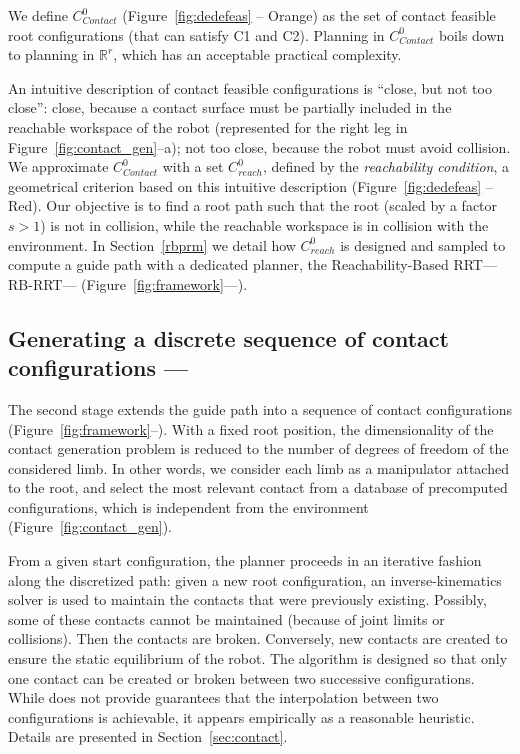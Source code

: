 We define $C_{Contact}^0$ (Figure~\ref{fig:dedefeas} -- Orange) as the set of \gls{contact feasible} root configurations (that can satisfy C1 and C2).
Planning in $C_{Contact}^0$ boils down to planning in $\mathbb{R}^r$, which has an acceptable practical complexity.

An intuitive description of \gls{contact feasible} configurations is ``close, but not too close'': close, because a contact surface must be partially included in the reachable workspace of the robot (represented for the right leg in Figure~\ref{fig:contact_gen}--a); not too close, because the robot must avoid collision.
We approximate $C_{Contact}^0$ with a set $C_{reach}^0$, defined by the \textit{reachability condition}, a geometrical criterion based on this intuitive description (Figure~\ref{fig:dedefeas} -- Red).
Our objective is to find a root path such that the root (scaled by a factor $s>1$) is not in collision, while the reachable workspace is in collision with the environment.
In Section~\ref{rbprm} we detail how  $C_{reach}^0$ is designed and sampled to compute a guide path with a dedicated planner, the Reachability-Based RRT---RB-RRT--- (Figure~\ref{fig:framework}---\Pa).

\subsection{Generating a discrete sequence of contact configurations --- \Pb}

The second stage extends the guide path into a sequence of contact configurations (Figure~\ref{fig:framework}--\Pb).
With a fixed root position, the dimensionality of the 
contact generation problem is reduced to the number of degrees of freedom of the considered limb. In other words, we consider each limb as a manipulator attached to the root, and select the most relevant contact from a database of precomputed configurations, which is independent from the environment (Figure~\ref{fig:contact_gen}).

From a given start configuration, the planner proceeds in an iterative fashion along the discretized path: given a new root configuration, an inverse-kinematics solver 
is used to maintain the contacts that were previously existing. Possibly, some of these contacts cannot be maintained (because of joint limits or collisions).
Then the contacts are broken. Conversely, new contacts are created to ensure the static equilibrium of the robot.
The algorithm is designed so that only one contact can be created or broken between two successive configurations. While does not provide guarantees that the interpolation between two configurations is achievable, it appears empirically as a reasonable heuristic.
Details are presented in Section~\ref{sec:contact}. 


